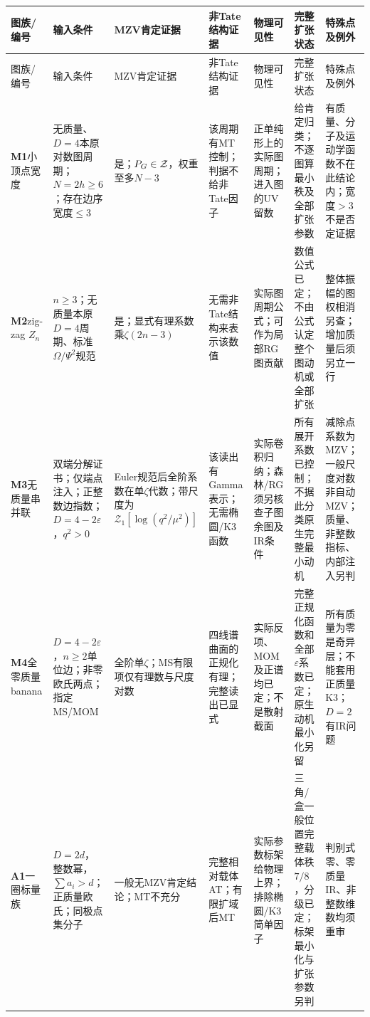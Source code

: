 \documentclass[11pt,a4paper]{ctexart}
\theoremstyle{cnplain}\newtheorem{theorem}{定理}[section]
\theoremstyle{definition}\newtheorem{definition}[theorem]{定义}
\theoremstyle{remark}\newtheorem{remark}[theorem]{注}
\begin{document}
\begin{landscape}
\begingroup
\renewcommand{\small}{\fontsize{8.8}{11.2}\selectfont}\small
\setlength{\tabcolsep}{1.2mm}\renewcommand{\arraystretch}{1.08}
\begin{longtable}{@{}>{\raggedright\arraybackslash}p{19mm}>{\raggedright\arraybackslash}p{35mm}>{\raggedright\arraybackslash}p{27mm}>{\raggedright\arraybackslash}p{36mm}>{\raggedright\arraybackslash}p{35mm}>{\raggedright\arraybackslash}p{43mm}>{\raggedright\arraybackslash}p{34mm}@{}}
\toprule 图族/编号&输入条件&MZV肯定证据&非Tate结构证据&物理可见性&完整扩张状态&特殊点及例外\\\midrule\endfirsthead
\toprule 图族/编号&输入条件&MZV肯定证据&非Tate结构证据&物理可见性&完整扩张状态&特殊点及例外\\\midrule\endhead
\bottomrule\endfoot
\textbf{M1}\newline 小顶点宽度&无质量、$D=4$本原对数图周期；$N=2h\ge6$；存在边序宽度$\le3$&是；$P_G\in{\cal Z}$，权重至多$N-3$&该周期有MT控制；判据不给非Tate因子&正单纯形上的实际图周期；进入图的UV留数&给肯定归类；不逐图算最小秩及全部扩张参数&有质量、分子及运动学函数不在此结论内；宽度$>3$不是否定证据\\\midrule
\textbf{M2}\newline zig-zag $Z_n$&$n\ge3$；无质量本原$D=4$周期、标准$\Omega/\Psi^2$规范&是；显式有理系数乘$\zeta(2n-3)$&无需非Tate结构来表示该数值&实际图周期公式；可作为局部RG图贡献&数值公式已定；不由公式认定整个图动机或全部扩张&整体振幅的图权相消另查；增加质量后须另立一行\\\midrule
\textbf{M3}\newline 无质量串并联&双端分解证书；仅端点注入；正整数边指数；$D=4-2\varepsilon$，$q^2>0$&Euler规范后全阶系数在单$\zeta$代数；带尺度为$\mathcal Z_1[\log(q^2/\mu^2)]$&该读出有Gamma表示；无需椭圆/K3函数&实际卷积归纳；森林/RG须另核查子图余图及IR条件&所有展开系数已控制；不据此分类原生完整最小动机&减除点系数为MZV；一般尺度对数非自动MZV；质量、非整数指标、内部注入另判\\\midrule
\textbf{M4}\newline 全零质量banana&$D=4-2\varepsilon$，$n\ge2$单位边；非零欧氏两点；指定MS/MOM&全阶单$\zeta$；MS有限项仅有理数与尺度对数&四线谱曲面的正规化有理；完整读出已显式&实际反项、MOM及正谱均已定；不是散射截面&完整正规化函数和全部$\varepsilon$系数已定；原生动机最小化另留&所有质量为零是奇异层；不能套用正质量K3；$D=2$有IR问题\\\midrule
\textbf{A1}\newline 一圈标量族&$D=2d$，整数幂，$\sum a_i>d$；正质量欧氏；同极点集分子&一般无MZV肯定结论；MT不充分&完整相对载体AT；有限扩域后MT&实际参数标架给物理上界；排除椭圆/K3简单因子&三角/盒一般位置完整载体秩$7/8$，分级已定；标架最小化与扩张参数另判&判别式零、零质量IR、非整数维数均须重审\\\midrule

\end{longtable}
\end{landscape}
\end{document}
